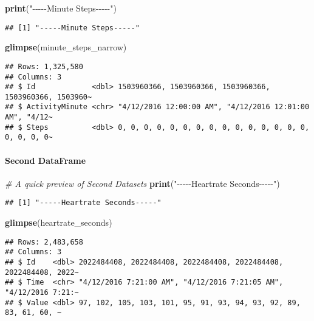 \documentclass[
]{article}
\newenvironment{Shaded}{\begin{snugshade}}{\end{snugshade}}
\newcommand{\CommentTok}[1]{\textcolor[rgb]{0.56,0.35,0.01}{\textit{#1}}}
\newcommand{\FunctionTok}[1]{\textcolor[rgb]{0.13,0.29,0.53}{\textbf{#1}}}
\newcommand{\NormalTok}[1]{#1}
\newcommand{\StringTok}[1]{\textcolor[rgb]{0.31,0.60,0.02}{#1}}
\begin{document}
\begin{Shaded}
\begin{Highlighting}[]
\FunctionTok{print}\NormalTok{(}\StringTok{"{-}{-}{-}{-}{-}Minute Steps{-}{-}{-}{-}{-}"}\NormalTok{)}
\end{Highlighting}
\end{Shaded}

\begin{verbatim}
## [1] "-----Minute Steps-----"
\end{verbatim}

\begin{Shaded}
\begin{Highlighting}[]
\FunctionTok{glimpse}\NormalTok{(minute\_steps\_narrow)}
\end{Highlighting}
\end{Shaded}

\begin{verbatim}
## Rows: 1,325,580
## Columns: 3
## $ Id             <dbl> 1503960366, 1503960366, 1503960366, 1503960366, 1503960~
## $ ActivityMinute <chr> "4/12/2016 12:00:00 AM", "4/12/2016 12:01:00 AM", "4/12~
## $ Steps          <dbl> 0, 0, 0, 0, 0, 0, 0, 0, 0, 0, 0, 0, 0, 0, 0, 0, 0, 0, 0~
\end{verbatim}

\hypertarget{second-dataframe}{%
\paragraph{Second DataFrame}\label{second-dataframe}}

\begin{Shaded}
\begin{Highlighting}[]
\CommentTok{\# A quick preview of Second Datasets}
\FunctionTok{print}\NormalTok{(}\StringTok{"{-}{-}{-}{-}{-}Heartrate Seconds{-}{-}{-}{-}{-}"}\NormalTok{)}
\end{Highlighting}
\end{Shaded}

\begin{verbatim}
## [1] "-----Heartrate Seconds-----"
\end{verbatim}

\begin{Shaded}
\begin{Highlighting}[]
\FunctionTok{glimpse}\NormalTok{(heartrate\_seconds)}
\end{Highlighting}
\end{Shaded}

\begin{verbatim}
## Rows: 2,483,658
## Columns: 3
## $ Id    <dbl> 2022484408, 2022484408, 2022484408, 2022484408, 2022484408, 2022~
## $ Time  <chr> "4/12/2016 7:21:00 AM", "4/12/2016 7:21:05 AM", "4/12/2016 7:21:~
## $ Value <dbl> 97, 102, 105, 103, 101, 95, 91, 93, 94, 93, 92, 89, 83, 61, 60, ~
\end{verbatim}
\end{document}
